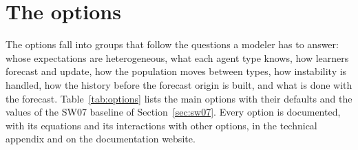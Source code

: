 \documentclass[pdflatex,sn-basic]{sn-jnl}
\begin{document}
\section{The options}\label{sec:options}

The options fall into groups that follow the questions a modeler has to answer: whose
expectations are heterogeneous, what each agent type knows, how learners forecast and update,
how the population moves between types, how instability is handled, how the history before the
forecast origin is built, and what is done with the forecast. Table~\ref{tab:options} lists the
main options with their defaults and the values of the SW07 baseline of
Section~\ref{sec:sw07}. Every option is documented, with its equations and its interactions with
other options, in the technical appendix and on the documentation website.
\end{document}
